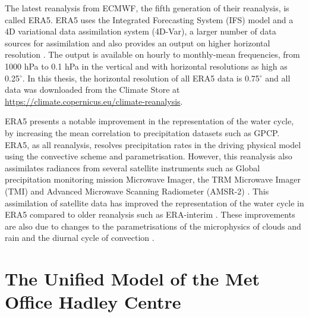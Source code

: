 The latest reanalysis from ECMWF, the fifth generation of their reanalysis, is called ERA5. 
ERA5 uses the Integrated Forecasting System (IFS) model and a 4D variational data assimilation system (4D-Var), a larger number of data sources for assimilation and also provides an output on higher horizontal resolution \citep{era5hersbach}. The output is available on hourly to monthly-mean frequencies, from 1000 hPa to 0.1 hPa in the vertical and with horizontal resolutions as high as 0.25$^\circ$. In this thesis, the horizontal resolution of all ERA5 data is 0.75$^\circ$ and all data was downloaded from the Climate Store at  \url{https://climate.copernicus.eu/climate-reanalysis}.

ERA5 presents a notable improvement in the representation of the water cycle, by increasing the mean correlation to precipitation datasets such as GPCP. 
ERA5, as all reanalysis, resolves precipitation rates in the driving physical model using the convective scheme and parametrisation. However, this reanalysis also assimilates radiances from several satellite instruments such as Global precipitation monitoring mission Microwave Imager, the TRM Microwave Imager (TMI) and Advanced Microwave Scanning Radiometer (AMSR-2) \cite{era5hersbach}. This assimilation of satellite data has improved the representation of the water cycle in ERA5 compared to older reanalysis such as ERA-interim \citep[e.g.][]{henin2018assessing}. These improvements are also due to changes to the parametrisations of the microphysics of clouds and rain \citep{forbes2014} and the diurnal cycle of convection \citep{bechtold2014}. 



\section{The Unified Model of the Met Office Hadley Centre}\label{sq:modeldata}

